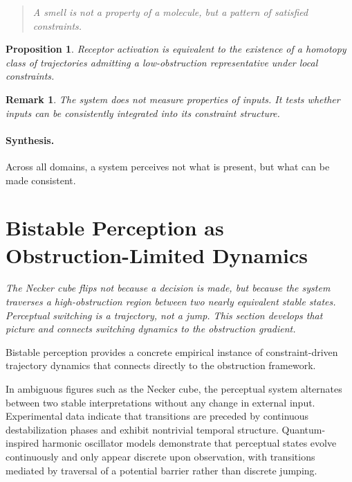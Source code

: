 \documentclass[12pt,a4paper]{article}
\newtheorem{proposition}[theorem]{Proposition}
\newtheorem{remark}[theorem]{Remark}
\begin{document}
\begin{quote}
\emph{A smell is not a property of a molecule, but a pattern of satisfied constraints.}
\end{quote}

\begin{proposition}
Receptor activation is equivalent to the existence of a homotopy class of trajectories admitting a low-obstruction representative under local constraints.
\end{proposition}

\begin{remark}
The system does not measure properties of inputs. It tests whether inputs can be consistently integrated into its constraint structure.
\end{remark}

\paragraph{Synthesis.}
Across all domains, a system perceives not what is present, but what can be made consistent.

\section{Bistable Perception as Obstruction-Limited Dynamics}
\label{sec:bistable}

\textit{The Necker cube flips not because a decision is made, but because the system traverses a high-obstruction region between two nearly equivalent stable states. Perceptual switching is a trajectory, not a jump. This section develops that picture and connects switching dynamics to the obstruction gradient.}

Bistable perception provides a concrete empirical instance of constraint-driven trajectory dynamics that connects directly to the obstruction framework.

In ambiguous figures such as the Necker cube, the perceptual system alternates between two stable interpretations without any change in external input. Experimental data indicate that transitions are preceded by continuous destabilization phases and exhibit nontrivial temporal structure. Quantum-inspired harmonic oscillator models demonstrate that perceptual states evolve continuously and only appear discrete upon observation, with transitions mediated by traversal of a potential barrier rather than discrete jumping.
\end{document}

